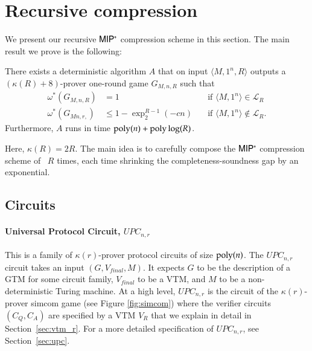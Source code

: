 
\section{Recursive compression}

We present our recursive ${\sf MIP^*}$ compression scheme in this section. The main result we prove is the following:

\begin{theorem}
	There exists a deterministic algorithm $A$ that on input $\langle M, 1^n, R \rangle$ outputs a $(\kappa(R) + 8)$-prover one-round game $G_{M,n,R}$ such that 
\begin{align*}
		\omega^*(G_{M,n,R}) &= 1  \quad & \text{if } \langle M,1^n \rangle\in \mathcal{L}_R \\
		\omega^*(G_{Mn,r,}) &\leq 1 - \exp^{R-1}_2(-cn) \quad &\text{if } \langle M,1^n \rangle\notin \mathcal{L}_R.
\end{align*}
Furthermore, $A$ runs in time $\operatorname{poly}(n) + \operatorname{poly}\log(R)$.	
\end{theorem}

Here, $\kappa(R) = 2R$.  The main idea is to carefully compose the ${\sf MIP^*}$ compression scheme of~\cite{ji2016compression} $R$ times, each time shrinking the completeness-soundness gap by an exponential. 



\subsection{Circuits}
\label{sec:circuits}

\paragraph{Universal Protocol Circuit, $UPC_{n,r}$} %
This is a family of $\kappa(r)$-prover protocol circuits of size $\operatorname{poly}(n)$. The $UPC_{n,r}$ circuit takes an input $(G,V_{final},M)$. It expects $G$ to be the description of a GTM for some circuit family, $V_{final}$ to be a VTM, and $M$ to be a non-deterministic Turing machine. At a high level, $UPC_{n,r}$ is the circuit of the $\kappa(r)$-prover simcom game (see Figure \ref{fig:simcom}) where the verifier circuits $(C_Q,C_A)$ are specified by a VTM $V_R$ that we explain in detail in Section~\ref{sec:vtm_r}. For a more detailed specification of $UPC_{n,r}$, see Section~\ref{sec:upc}.

